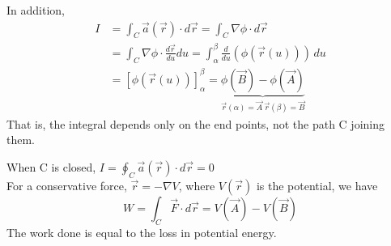\documentclass[a4paper, 11pt, normalem]{report}
\newcommand\veca{\vec{a}(\vec{r})}
\newcommand\veru{\vec{r}(u)}
\begin{document}
In addition,
\begin{align*}
    I &= \int_C \veca \cdot d\vec{r} = \int_C \nabla \phi \cdot d\vec{r} \\
    &= \int_C \nabla \phi \cdot \frac{d\vec{r}}{du}du = \int_\alpha^\beta \frac{d}{du}(\phi(\veru))\,du \\
    &= [\phi(\veru)]_{\alpha}^{\beta} = \underbrace{\phi(\vec{B}) - \phi(\vec{A})}_{\vec{r}(\alpha) = \vec{A}~ \vec{r}(\beta) = \vec{B}}
\end{align*}
That is, the integral depends only on the end points, not the path C joining them.

When C is closed, $I = \oint_C \veca \cdot d\vec{r} = 0$ \\
For a conservative force, $\vec{r} = -\nabla V$, where $V(\vec{r})$ is the potential, we have
\begin{equation*}
    W = \int_C \vec{F}\cdot d\vec{r} = V(\vec{A}) - V(\vec{B})
\end{equation*}
The work done is equal to the loss in potential energy.
\end{document}
